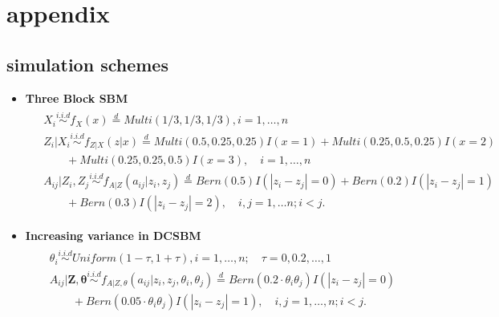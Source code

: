 \documentclass[12pt]{article}
\theoremstyle{definition}
\begin{document}
\appendix
\section{appendix}
\label{sec:appendix}

\subsection{simulation schemes}
\begin{itemize}	

	\item \textbf{Three Block SBM}
	\begin{equation}
	\label{eq:Three}
	\begin{gathered}
	\begin{aligned}
	&  X_{i} \overset{i.i.d}{\sim} f_{X}(x)   \stackrel{d}{=}  Multi(1/3, 1/3, 1/3), i = 1, \ldots , n \\ 
	&  Z_{i} | X_{i}  \overset{i.i.d}{\sim}    f_{Z|X}(z|x)  \stackrel{d}{=}   Multi(0.5, 0.25, 0.25) I( x = 1 ) +   Multi(0.25, 0.5, 0.25) I (x = 2)  \qquad  \\ & \quad \quad + Multi(0.25, 0.25, 0.5)I(x = 3), \quad  i = 1,\ldots,n  \\
	&  A_{ij} | Z_{i}, Z_{j}   \overset{i.i.d}{\sim}   f_{A|Z}(a_{ij} | z_{i}, z_{j}) \stackrel{d}{=}  Bern(0.5) I ( |z_{i} - z_{j}| = 0 )  + Bern(0.2) I(|z_{i} - z_{j}| = 1) \\ & \quad \quad + Bern(0.3) I (|z_{i} - z_{j}| = 2),  \quad i,j=1, \ldots n ; i < j.
	\end{aligned}
	\end{gathered}
	\end{equation}
	
\item \textbf{Increasing variance in DCSBM}
	\begin{equation}
	\label{eq:dcVariance}
	\begin{gathered}
	\begin{aligned}
	& \theta_{i} \overset{i.i.d}{\sim} Uniform(1 - \tau, 1 + \tau), i = 1, \ldots, n; \quad \tau = 0, 0.2, \ldots, 1\\ 
	& A_{ij} | \mathbf{Z}, \mathbf{\theta}   \overset{i.i.d}{\sim}   f_{A|Z, \theta}(a_{ij} | z_{i}, z_{j}, \theta_{i}, \theta_{j}) \stackrel{d}{=} Bern(0.2 \cdot \theta_{i}\theta_{j}) I ( |z_{i} - z_{j}| = 0 ) \\ & \quad \quad + Bern(0.05 \cdot \theta_{i} \theta_{j} ) I(|z_{i} - z_{j}| = 1), \quad i,j=1, \ldots, n; i < j. 
	\end{aligned}
	\end{gathered}
	\end{equation}


\end{itemize}
\end{document}
